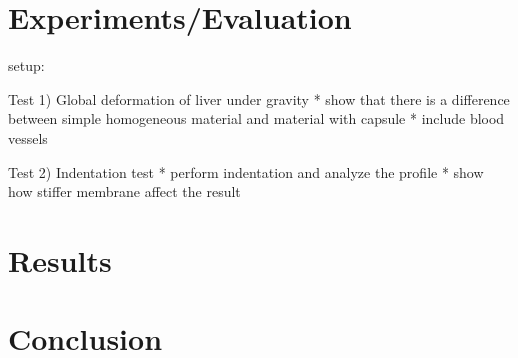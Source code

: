 \documentclass{llncs}
\begin{document}


\section{Experiments/Evaluation}

setup:

Test 1) Global deformation of liver under gravity
  * show that there is a difference between simple homogeneous material
    and material with capsule
  * include blood vessels

Test 2) Indentation test
  * perform indentation and analyze the profile
  * show how stiffer membrane affect the result


\section{Results}

\section{Conclusion}



%
%



\end{document}
